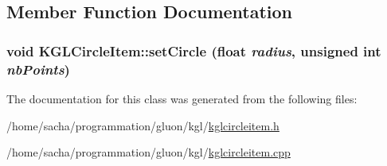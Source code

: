 \subsection{Member Function Documentation}
\hypertarget{class_k_g_l_circle_item_0a0419138f452f5d0e65fb28c77bda96}{
\subsubsection[{setCircle}]{\setlength{\rightskip}{0pt plus 5cm}void KGLCircleItem::setCircle (float {\em radius}, \/  unsigned int {\em nbPoints})}}
\label{class_k_g_l_circle_item_0a0419138f452f5d0e65fb28c77bda96}




The documentation for this class was generated from the following files:\begin{CompactItemize}
\item 
/home/sacha/programmation/gluon/kgl/\hyperlink{kglcircleitem_8h}{kglcircleitem.h}\item 
/home/sacha/programmation/gluon/kgl/\hyperlink{kglcircleitem_8cpp}{kglcircleitem.cpp}\end{CompactItemize}
